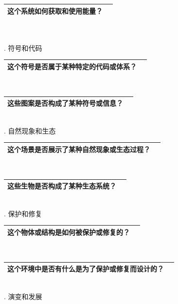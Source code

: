 \documentclass[12pt]{book}
\begin{document}
\begin{tabular}{|p{15cm}|p{3cm}|}
	\hline
这个系统如何获取和使用能量？\\
	\hline
\end{tabular}\\\\



. 符号和代码

\begin{tabular}{|p{15cm}|p{3cm}|}
	\hline
这个符号是否属于某种特定的代码或体系？\\
	\hline
\end{tabular}\\



\begin{tabular}{|p{15cm}|p{3cm}|}
	\hline
这些图案是否构成了某种符号或信息？\\
	\hline
\end{tabular}\\


. 自然现象和生态

\begin{tabular}{|p{15cm}|p{3cm}|}
	\hline
这个场景是否展示了某种自然现象或生态过程？\\
	\hline
\end{tabular}\\


\begin{tabular}{|p{15cm}|p{3cm}|}
	\hline
这些生物是否构成了某种生态系统？\\
	\hline
\end{tabular}\\


. 保护和修复

\begin{tabular}{|p{15cm}|p{3cm}|}
	\hline
这个物体或结构是如何被保护或修复的？\\
	\hline
\end{tabular}\\



\begin{tabular}{|p{15cm}|p{3cm}|}
	\hline
这个环境中是否有什么是为了保护或修复而设计的？\\
	\hline
\end{tabular}\\



. 演变和发展
\end{document}
